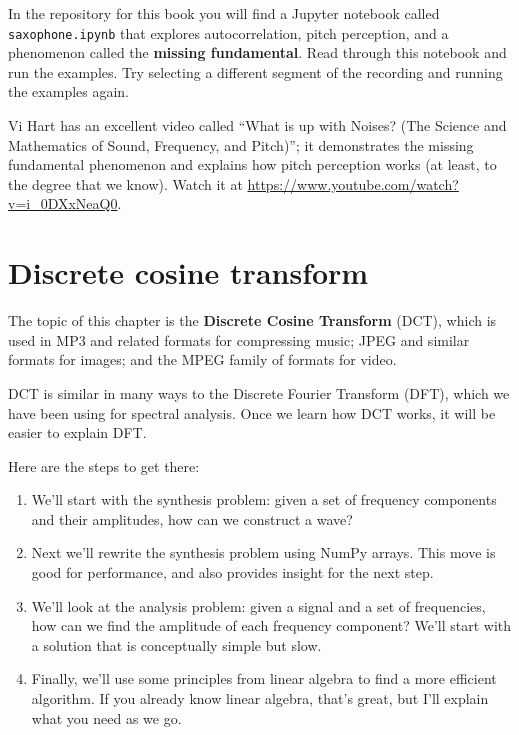 \documentclass[12pt]{book} \usepackage[width=5.5in,height=8.5in, hmarginratio=3:2,vmarginratio=1:1]{geometry}
\begin{document}
\begin{exercise} In the repository for this book you will find a Jupyter notebook called \verb"saxophone.ipynb" that explores autocorrelation, pitch perception, and a phenomenon called the {\bf missing fundamental}. Read through this notebook and run the examples. Try selecting a different segment of the recording and running the examples again. 

Vi Hart has an excellent video called ``What is up with Noises? (The Science and Mathematics of Sound, Frequency, and Pitch)''; it demonstrates the missing fundamental phenomenon and explains how pitch perception works (at least, to the degree that we know). Watch it at \url{https://www.youtube.com/watch?v=i_0DXxNeaQ0}. 

\end{exercise} 

\chapter{Discrete cosine transform} \label{dct} 

The topic of this chapter is the {\bf Discrete Cosine Transform} (DCT), which is used in MP3 and related formats for compressing music; JPEG and similar formats for images; and the MPEG family of formats for video. 

DCT is similar in many ways to the Discrete Fourier Transform (DFT), which we have been using for spectral analysis. Once we learn how DCT works, it will be easier to explain DFT. 

Here are the steps to get there: 

\begin{enumerate} 

\item We'll start with the synthesis problem: given a set of frequency components and their amplitudes, how can we construct a wave? 

\item Next we'll rewrite the synthesis problem using NumPy arrays. This move is good for performance, and also provides insight for the next step. 

\item We'll look at the analysis problem: given a signal and a set of frequencies, how can we find the amplitude of each frequency component? We'll start with a solution that is conceptually simple but slow. 

\item Finally, we'll use some principles from linear algebra to find a more efficient algorithm. If you already know linear algebra, that's great, but I'll explain what you need as we go. 

\end{enumerate} 
\end{document}
